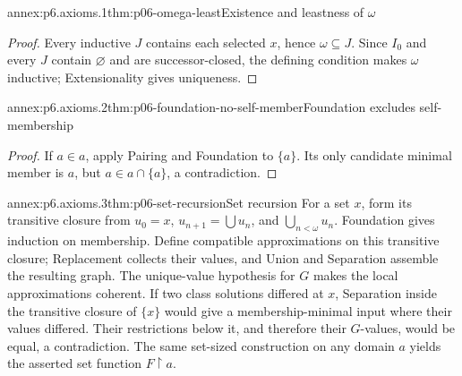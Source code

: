 
\begin{annexitem}{annex:p6.axioms.1}{thm:p06-omega-least}{Existence and leastness of \(\omega\)}
\begin{proof}
Every inductive \(J\) contains each selected \(x\), hence \(\omega\subseteq J\).
Since \(I_0\) and every \(J\) contain \(\varnothing\) and are
successor-closed, the defining condition makes \(\omega\) inductive;
Extensionality gives uniqueness.
\end{proof}
\end{annexitem}

\begin{annexitem}{annex:p6.axioms.2}{thm:p06-foundation-no-self-member}{Foundation excludes self-membership}
\begin{proof}
If \(a\in a\), apply Pairing and Foundation to \(\{a\}\).  Its only candidate
minimal member is \(a\), but \(a\in a\cap\{a\}\), a contradiction.
\end{proof}
\end{annexitem}

\begin{annexitem}{annex:p6.axioms.3}{thm:p06-set-recursion}{Set recursion}
For a set \(x\), form its transitive closure from
\(u_0=x\), \(u_{n+1}=\bigcup u_n\), and
\(\bigcup_{n<\omega}u_n\).  Foundation gives induction on membership.
Define compatible approximations on this transitive closure; Replacement
collects their values, and Union and Separation assemble the resulting graph.
The unique-value hypothesis for \(G\) makes the local approximations coherent.
If two class solutions differed at \(x\), Separation inside the transitive
closure of \(\{x\}\) would give a membership-minimal input where their values
differed.  Their restrictions below it, and therefore their \(G\)-values,
would be equal, a contradiction.  The same set-sized construction on any
domain \(a\) yields the asserted set function
\(F\mathbin{\upharpoonright}a\).
\end{annexitem}

